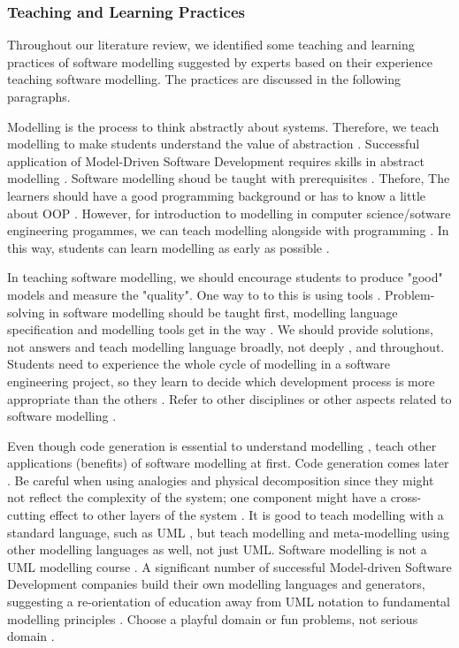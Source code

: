 \documentclass[12pt, a4paper]{report}
\begin{document}
{\subsubsection{Teaching and Learning Practices}
Throughout our literature review, we identified some teaching and learning practices of software modelling suggested by experts based on their experience teaching software modelling. The practices are discussed in the following paragraphs.

Modelling is the process to think abstractly about systems. Therefore, we teach modelling to make students understand the value of abstraction \cite{bezivin2009teaching}. Successful application of Model-Driven Software Development requires skills in abstract modelling \cite{whittle2013industrial}. Software modelling shoud be taught with prerequisites \cite{paige2014bad}. Thefore, The learners should have a good programming background \cite{bezivin2009teaching} or has to know a little about OOP \cite{Akayama2013}. However, for introduction to modelling in computer science/sotware engineering progammes, we can teach modelling alongside with programming \cite{borstler2012teaching, bezivin2009teaching}. In this way, students can learn modelling as early as possible \cite{Akayama2013, borstler2012teaching}. 

In teaching software modelling, we should encourage students to produce "good" models and measure the "quality". One way to to this is using tools \cite{Akayama2013}. Problem-solving in software modelling should be taught first, modelling language specification and modelling tools get in the way \cite{paige2014bad}. We should provide solutions, not answers \cite{paige2014bad} and teach modelling language broadly, not deeply \cite{paige2014bad}, and throughout\cite{borstler2012teaching}. Students need to experience the whole cycle of modelling in a software engineering project, so they learn to decide which development process is more appropriate than the others \cite{Akayama2013}. Refer to other disciplines or other aspects related to software modelling \cite{paige2014bad}.

Even though code generation is essential to understand modelling \cite{liebel2015ready}, teach other applications (benefits) of software modelling at first. Code generation comes later \cite{paige2014bad}. Be careful when using analogies and physical decomposition since they might not reflect the complexity of the system; one component might have a cross-cutting effect to other layers of the system \cite{paige2014bad}.  It is good to teach modelling with a standard language, such as UML \cite{bezivin2009teaching}, but teach modelling and meta-modelling using other modelling languages as well, not just UML. Software modelling is not a UML modelling course \cite{paige2014bad}. A significant number of successful Model-driven Software Development companies build their own modelling languages and generators, suggesting a re-orientation of education away from UML notation to fundamental modelling principles \cite{whittle2013industrial}. Choose a playful domain or fun problems, not serious domain \cite{paige2014bad}.

}
\end{document}
